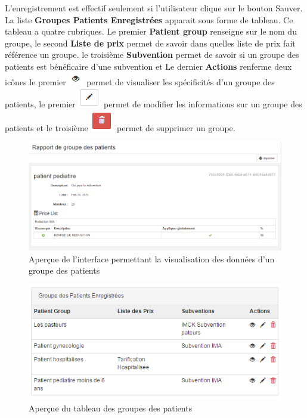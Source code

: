 \documentclass[12pt,a4paper]{report}
\begin{document}
L'enregistrement est effectif seulement si l'utilisateur clique sur le bouton Sauver. La liste \textbf{Groupes Patients Enregistrées} apparait sous forme de tableau. Ce tableau a quatre rubriques. Le premier \textbf{Patient group} renseigne sur le nom du groupe, le second \textbf{Liste de prix} permet de savoir dans quelles liste de prix fait référence un groupe. le troisième \textbf{Subvention} permet de savoir si un groupe des patients est bénéficaire d'une subvention et Le dernier \textbf{Actions} renferme deux icônes le premier \includegraphics[scale=0.7]{pic/blackEyes.png}  permet de visualiser les spécificités d'un groupe des patients, le premier \includegraphics[scale=0.7]{pic/EditBlack.png}  permet de modifier les informations sur un groupe des patients et le troisième \includegraphics[scale=0.7]{pic/DeleteRed.png}  permet de supprimer un groupe.

\begin{figure}[h]
\begin{center}
\includegraphics[width=12cm]{pic/DetaiGrouPAtient.png}
\end{center}
\caption{Aperçue de l'interface permettant la visualisation des données d'un groupe des patients}
\label{Aperçue de l'interface permettant la visualisation des données d'un groupe des patients}
\end{figure}


\begin{figure}[h]
\begin{center}
\includegraphics[width=12cm]{pic/TabGroupMalade.png}
\end{center}
\caption{Aperçue du tableau des groupes des patients}
\label{Aperçue du tableau des groupes des patients}
\end{figure}
\end{document}
